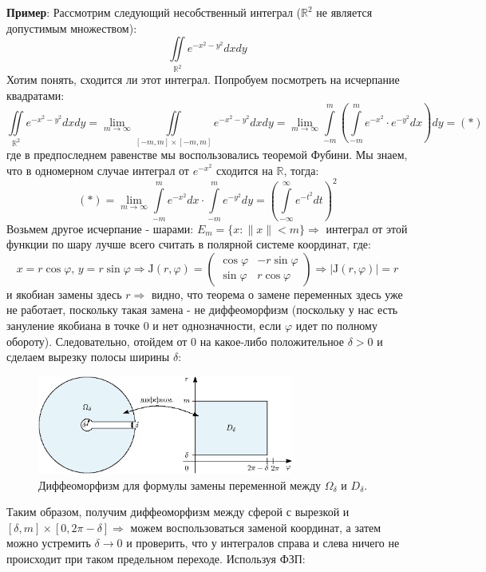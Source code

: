 \documentclass[12pt]{article}
\newcommand{\MR}{\mathbb{R}}
\newcommand{\MJ}{\mathrm{J}}
\theoremstyle{definition}
\newcommand{\ddint}[2]{\displaystyle\int\limits_{#1}^{#2}}
\begin{document}
\textbf{Пример}: Рассмотрим следующий несобственный интеграл ($\MR^2$ не является допустимым множеством):
$$
	\iint\limits_{\MR^2}e^{-x^2 - y^2}dxdy
$$
Хотим понять, сходится ли этот интеграл. Попробуем посмотреть на исчерпание квадратами:
$$
	\iint\limits_{\MR^2}e^{-x^2 - y^2}dxdy = \lim\limits_{m \to \infty}\iint\limits_{[-m,m]\times[-m,m]}e^{-x^2 - y^2}dxdy = \lim\limits_{m \to \infty}\ddint{-m}{m}\left(\ddint{-m}{m}e^{-x^2}{\cdot}e^{-y^2}dx\right)dy = (*)
$$
где в предпоследнем равенстве мы воспользовались теоремой Фубини. Мы знаем, что в одномерном случае интеграл  от $e^{-x^2}$ сходится на $\MR$, тогда:
$$
	(*) = \lim\limits_{m \to \infty}\ddint{-m}{m}e^{-x^2}dx{\cdot}\ddint{-m}{m}e^{-y^2}dy = \left(\ddint{-\infty}{\infty}e^{-t^2}dt\right)^2
$$
Возьмем другое исчерпание - шарами: $E_m = \{x \colon \|x\| < m\} \Rightarrow $ интеграл от этой функции по шару лучше всего считать в полярной системе координат, где:	
$$
	x = r\cos{\varphi}, \, y = r\sin{\varphi} \Rightarrow \MJ(r,\varphi) = 
	\begin{pmatrix}
		\cos{\varphi} & -r \sin{\varphi}\\
		\sin{\varphi} & r\cos{\varphi}
	\end{pmatrix} \Rightarrow |\MJ(r,\varphi)| = r
$$
и якобиан замены здесь $r \Rightarrow$ видно, что теорема о замене переменных здесь уже не работает, поскольку такая замена - не диффеоморфизм (поскольку у нас есть зануление якобиана в точке $0$ и нет однозначности, если $\varphi$ идет по полному обороту). Следовательно, отойдем от $0$ на какое-либо положительное $\delta > 0$ и сделаем вырезку полосы ширины $\delta$:
\begin{figure}[H]
	\centering
	\includegraphics[width=0.75\textwidth]{MA4L9_2.eps}
	\caption{Диффеоморфизм для формулы замены переменной между $\Omega_\delta$ и $D_\delta$.}
	\label{9_2}
\end{figure}
Таким образом, получим диффеоморфизм между сферой с вырезкой и $[\delta,m] \times [0,2 \pi - \delta] \Rightarrow$ можем воспользоваться заменой координат, а затем можно устремить $\delta \to 0$ и проверить, что у интегралов справа и слева ничего не происходит при таком предельном переходе. Используя ФЗП:
\end{document}
